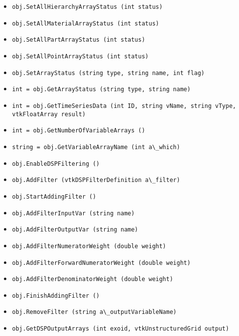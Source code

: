 \begin{itemize}
\item  \verb|obj.SetAllHierarchyArrayStatus (int status)|

\item  \verb|obj.SetAllMaterialArrayStatus (int status)|

\item  \verb|obj.SetAllPartArrayStatus (int status)|

\item  \verb|obj.SetAllPointArrayStatus (int status)|

\item  \verb|obj.SetArrayStatus (string type, string name, int flag)|

\item  \verb|int = obj.GetArrayStatus (string type, string name)|

\item  \verb|int = obj.GetTimeSeriesData (int ID, string vName, string vType, vtkFloatArray result)|

\item  \verb|int = obj.GetNumberOfVariableArrays ()|

\item  \verb|string = obj.GetVariableArrayName (int a\_which)|

\item  \verb|obj.EnableDSPFiltering ()|

\item  \verb|obj.AddFilter (vtkDSPFilterDefinition a\_filter)|

\item  \verb|obj.StartAddingFilter ()|

\item  \verb|obj.AddFilterInputVar (string name)|

\item  \verb|obj.AddFilterOutputVar (string name)|

\item  \verb|obj.AddFilterNumeratorWeight (double weight)|

\item  \verb|obj.AddFilterForwardNumeratorWeight (double weight)|

\item  \verb|obj.AddFilterDenominatorWeight (double weight)|

\item  \verb|obj.FinishAddingFilter ()|

\item  \verb|obj.RemoveFilter (string a\_outputVariableName)|

\item  \verb|obj.GetDSPOutputArrays (int exoid, vtkUnstructuredGrid output)|

\end{itemize}
